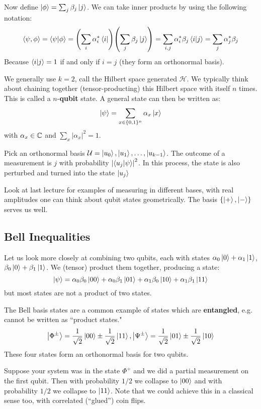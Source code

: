 Now define $\ket{\phi} = \sum_j \beta_j \ket{j}$. We can take inner products by using the following notation:
\[ \langle \psi, \phi \rangle = \braket{\psi}{\phi} = \qty(\sum_{i} \alpha_i^* \bra{i})\qty(\sum_{j} \beta_j \ket{j}) = \sum_{i,j} \alpha_i^* \beta_j \braket{i}{j} = \sum_{j} \alpha_j^* \beta_j\]
Because $\braket{i}{j} = 1$ if and only if $i = j$ (they form an orthonormal basis).

We generally use $k = 2$, call the Hilbert space generated $\mathcal{H}$. We typically think about chaining together (tensor-producting)
this Hilbert space with itself $n$ times. This is called a $n$-\textbf{qubit} state. A general state can then be written as:
\[ \ket{\psi} = \sum_{x \in \{0, 1\}^n} \alpha_x \ket{x} \]
with $\alpha_x \in \operatorname{\mathbb{C}}$ and $\sum_{x} |\alpha_x|^2 = 1$.

\begin{note}
    Pick an orthonormal basis $\mathcal{U} = \ket{u_0}, \ket{u_1}, \dots, \ket{u_{k - 1}}$. The outcome of a measurement is $j$ with
    probability $\qty|\braket{u_j}{\psi}|^2$. In this process, the state is also perturbed and turned into the state $\ket{u_j}$
\end{note}

Look at last lecture for examples of measuring in different bases, with real amplitudes one can think about qubit states geometrically.
The basis $\{ \ket{+}, \ket{-} \}$ serves us well.

\subsection{Bell Inequalities}
Let us look more closely at combining two qubits, each with states $\alpha_0 \ket{0} + \alpha_1 \ket{1}$, $\beta_0 \ket{0} + \beta_1 \ket{1}$.
We (tensor) product them together, producing a state:
\[ \ket{\psi} = \alpha_0 \beta_0 \ket{00} + \alpha_0 \beta_1 \ket{01} + \alpha_1 \beta_0 \ket{10} + \alpha_1 \beta_1 \ket{11} \]
but most states are not a product of two states.

The Bell basis states are a common example of states which are \textbf{entangled}, e.g. cannot be written as ``product states."
\[ \ket{\Phi^{\pm}} = \frac{1}{\sqrt{2}} \ket{00} \pm \frac{1}{\sqrt{2}} \ket{11}, \ket{\Psi^{\pm}} = \frac{1}{\sqrt{2}} \ket{01} \pm \frac{1}{\sqrt{2}} \ket{10}  \]
These four states form an orthonormal basis for two qubits.

Suppose your system was in the state $\Phi^+$ and we did a partial measurement on the first qubit.
Then with probability $1/2$ we collapse to $\ket{00}$ and with probability $1/2$ we collapse to $\ket{11}$. Note that we could achieve this
in a classical sense too, with correlated (``glued'') coin flips.

